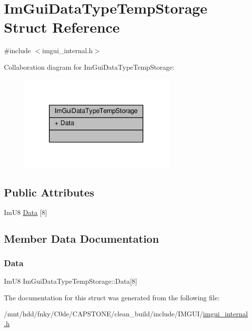 \hypertarget{structImGuiDataTypeTempStorage}{}\section{Im\+Gui\+Data\+Type\+Temp\+Storage Struct Reference}
\label{structImGuiDataTypeTempStorage}


{\ttfamily \#include $<$imgui\+\_\+internal.\+h$>$}



Collaboration diagram for Im\+Gui\+Data\+Type\+Temp\+Storage\+:
\nopagebreak
\begin{figure}[H]
\begin{center}
\leavevmode
\includegraphics[width=224pt]{structImGuiDataTypeTempStorage__coll__graph}
\end{center}
\end{figure}
\subsection*{Public Attributes}
\begin{DoxyCompactItemize}
\item 
Im\+U8 \hyperlink{structImGuiDataTypeTempStorage_a3fcf6289f880d7b1c44e13760b73ea51}{Data} \mbox{[}8\mbox{]}
\end{DoxyCompactItemize}


\subsection{Member Data Documentation}
\mbox{\label{structImGuiDataTypeTempStorage_a3fcf6289f880d7b1c44e13760b73ea51}} 
\subsubsection{\texorpdfstring{Data}{Data}}
{\footnotesize\ttfamily Im\+U8 Im\+Gui\+Data\+Type\+Temp\+Storage\+::\+Data\mbox{[}8\mbox{]}}



The documentation for this struct was generated from the following file\+:\begin{DoxyCompactItemize}
\item 
/mnt/hdd/fnky/\+C0de/\+C\+A\+P\+S\+T\+O\+N\+E/clean\+\_\+build/include/\+I\+M\+G\+U\+I/\hyperlink{imgui__internal_8h}{imgui\+\_\+internal.\+h}\end{DoxyCompactItemize}
